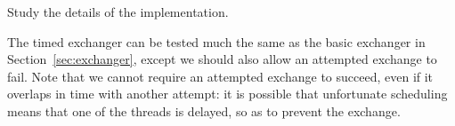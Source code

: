 \begin{instruction}
Study the details of the implementation.
\end{instruction}

The timed exchanger can be tested much the same as the basic exchanger in
Section~\ref{sec:exchanger}, except we should also allow an attempted exchange
to fail.  Note that we cannot require an attempted exchange to succeed, even
if it overlaps in time with another attempt: it is possible that unfortunate
scheduling means that one of the threads is delayed, so as to prevent the
exchange.
